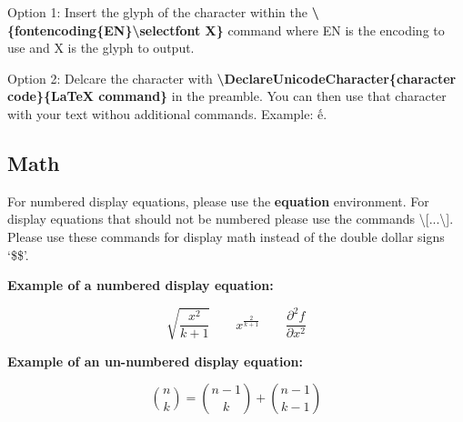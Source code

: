 \documentclass{csmagazine}
\begin{document}
Option 1: Insert the glyph of the character within the \textbf{\textbackslash{}\{fontencoding\{EN\}\textbackslash{}selectfont X\}} command where EN is the encoding to use and X is the glyph to output.


Option 2: Delcare the character with \textbf{\textbackslash{}DeclareUnicodeCharacter\{character code\}\{LaTeX command\}} in the preamble. You can then use that character with your text withou additional commands. Example: ế.




\subsection{Math}

For numbered display equations, please use the \textbf{equation} environment. For display equations that should not be numbered please use the commands \textbackslash[...\textbackslash]. Please use these commands for display math instead of the double dollar signs `\$\$'.

\textbf{Example of a numbered display equation:}

\begin{equation}
\sqrt{\frac{x^2}{k+1}}\qquad
x^\frac{2}{k+1}\qquad
\frac{\partial^2f}{\partial x^2}
\end{equation}

\textbf{Example of an un-numbered display equation:}

\[\binom{n}{k} =\binom{n-1}{k} + \binom{n-1}{k-1}\]
\end{document}
